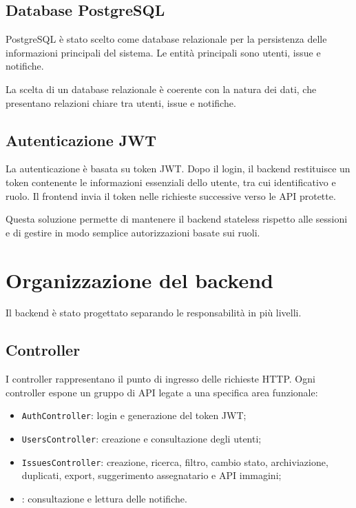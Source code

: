 \documentclass[12pt,a4paper]{article}
\begin{document}
\subsection{Database PostgreSQL}

PostgreSQL è stato scelto come database relazionale per la persistenza delle informazioni principali del sistema. Le entità principali sono utenti, issue e notifiche.

La scelta di un database relazionale è coerente con la natura dei dati, che presentano relazioni chiare tra utenti, issue e notifiche.

\subsection{Autenticazione JWT}

La autenticazione è basata su token JWT. Dopo il login, il backend restituisce un token contenente le informazioni essenziali dello utente, tra cui identificativo e ruolo. Il frontend invia il token nelle richieste successive verso le API protette.

Questa soluzione permette di mantenere il backend stateless rispetto alle sessioni e di gestire in modo semplice autorizzazioni basate sui ruoli.

\section{Organizzazione del backend}

Il backend è stato progettato separando le responsabilità in più livelli.

\subsection{Controller}

I controller rappresentano il punto di ingresso delle richieste HTTP. Ogni controller espone un gruppo di API legate a una specifica area funzionale:

\begin{itemize}
    \item \texttt{AuthController}: login e generazione del token JWT;
    \item \texttt{UsersController}: creazione e consultazione degli utenti;
    \item \texttt{IssuesController}: creazione, ricerca, filtro, cambio stato, archiviazione, duplicati, export, suggerimento assegnatario e API immagini;
    \item {}: consultazione e lettura delle notifiche.
\end{itemize}
\end{document}
